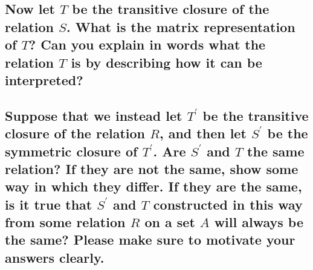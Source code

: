\documentclass[a4paper,12pt]{article}
\begin{document}
\subsection[]{Now let $T$ be the transitive closure of the relation $S$. What is the matrix representation of $T$? 
Can you explain in words what the relation $T$ is by describing how it can be interpreted?
}



\subsection[]{Suppose that we instead let $T^\prime$ be the transitive closure of the relation $R$, and then let
$S^\prime$ be the symmetric closure of $T^\prime$. Are $S^\prime$ and $T$ the same relation? If they are not the
same, show some way in which they differ. If they are the same, is it true that $S^\prime$ and $T$
constructed in this way from some relation $R$ on a set $A$ will always be the same? Please
make sure to motivate your answers clearly.
}
\end{document}
